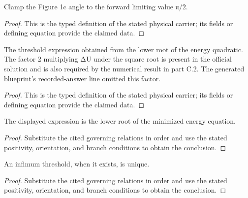 \begin{definition}
  \label{def:physics:IPhO_2026_1_C_1:aux019}
  Clamp the Figure 1c angle to the forward limiting value π/2.
\end{definition}
\begin{proof}
  This is the typed definition of the stated physical carrier; its fields or defining equation provide the claimed data.
\end{proof}

\begin{definition}
  \label{def:physics:IPhO_2026_1_C_1:aux020}
  The threshold expression obtained from the lower root of the energy quadratic. The factor 2 multiplying ΔU under the square root is present in the official solution and is also required by the numerical result in part C.2. The generated blueprint's recorded-answer line omitted this factor.
\end{definition}
\begin{proof}
  This is the typed definition of the stated physical carrier; its fields or defining equation provide the claimed data.
\end{proof}

\begin{lemma}
  \label{lem:physics:IPhO_2026_1_C_1:aux021}
  The displayed expression is the lower root of the minimized energy equation.
\end{lemma}
\begin{proof}
  Substitute the cited governing relations in order and use the stated positivity, orientation, and branch conditions to obtain the conclusion.
\end{proof}

\begin{lemma}
  \label{lem:physics:IPhO_2026_1_C_1:aux022}
  An infimum threshold, when it exists, is unique.
\end{lemma}
\begin{proof}
  Substitute the cited governing relations in order and use the stated positivity, orientation, and branch conditions to obtain the conclusion.
\end{proof}

